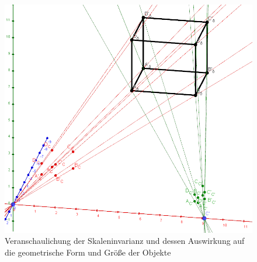 
\begin{figure}[!htb]
	\centering
	\includegraphics[width=0.42\linewidth]{images/ScaleInvariance_3.png}
	\caption[Skalierung der Rekonstruierten Szene]{Veranschaulichung der Skaleninvarianz und dessen Auswirkung auf die geometrische Form und Größe der Objekte} 
	\label{fig:scale3}
\end{figure}



